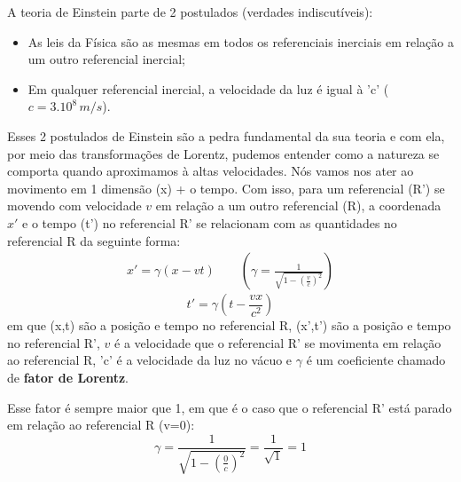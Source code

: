 \documentclass[12pt]{extarticle}
\newcommand{\<}{\langle}
\renewcommand{\>}{\rangle}
\theoremstyle{definition}
\begin{document}
A teoria de Einstein parte de 2 postulados (verdades indiscutíveis):
\begin{itemize}
    \item As leis da Física são as mesmas em todos os referenciais inerciais em relação a um outro referencial inercial;
    \item Em qualquer referencial inercial, a velocidade da luz é igual à 'c' ($c=3.10^8\,m/s$).
\end{itemize}

Esses 2 postulados de Einstein são a pedra fundamental da sua teoria e com ela, por meio das transformações de Lorentz, pudemos entender como a natureza se comporta quando aproximamos à altas velocidades. Nós vamos nos ater ao movimento em 1 dimensão (x) + o tempo. Com isso, para um referencial (R') se movendo com velocidade $v$ em relação a um outro referencial (R), a coordenada $x'$ e o tempo (t') no referencial R' se relacionam com as quantidades no referencial R da seguinte forma:
\begin{align}\label{eq:rel_restrita1}
    x' = \gamma(x -vt)\quad \quad \left(\gamma = \frac{1}{\sqrt{1-\left(\frac{v}{c}\right)^2}}\right)
\end{align}
\begin{equation}\label{eq:rel_restrita2}
    t' = \gamma(t-\frac{vx}{c^2})
\end{equation}
\noindent em que  (x,t) são a posição e tempo no referencial R, (x',t') são a posição e tempo no referencial R', $v$ é a velocidade que o referencial R' se movimenta em relação ao referencial R, 'c' é a velocidade da luz no vácuo e $\gamma$ é um coeficiente chamado de \textbf{fator de Lorentz}.

Esse fator é sempre maior que 1, em que é o caso que o referencial R' está parado em relação ao referencial R (v=0):
\begin{equation}
    \gamma = \frac{1}{\sqrt{1- \left(\frac{0}{c}\right)^2}} = \frac{1}{\sqrt{1}} =1
\end{equation}
\end{document}
